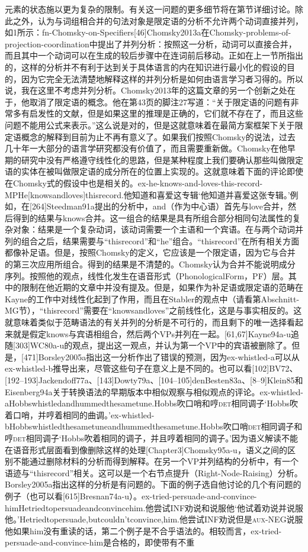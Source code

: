 元素的状态施以更为复杂的限制。有关这一问题的更多细节将在第节详细讨论。除此之外，认为与词组相合并的句法对象是限定语的分析不允许两个动词直接并列，如1所示：fn-Chomsky-on-Specifiers[46]Chomsky2013a在Chomsky-problems-of-projection-coordination中提出了并列分析：按照这一分析，动词可以直接合并，而且其中一个动词可以在生成的较后步骤中在连词前后移动。正如在上一节所指出的，这样的分析并不有利于达到关于具体语言的内在知识进行最小化的假设的目的，因为它完全无法清楚地解释这样的并列分析是如何由语言学习者习得的。所以说，我在这里不考虑并列分析。Chomsky2013年的这篇文章的另一个创新之处在于，他取消了限定语的概念。他在第43页的脚注27写道：“关于限定语的问题有非常多有启发性的文献，但是如果这里的推理是正确的，它们就不存在了，而且这些问题不能用公式来表示。”这么说是对的，但是这就意味着在最简方案框架下关于限定语概念的解释到目前为止不再有意义了。如果我们按照Chomsky的说法，过去几十年一大部分的语言学研究都没有价值了，而且需要重新做。Chomsky在他早期的研究中没有严格遵守线性化的思路，但是某种程度上我们要确认那些叫做限定语的实体在被叫做限定语的成分所在的位置上实现的。这就意味着下面的评论即使在Chomsky式的假设中也是相关的。ex-he-knows-and-loves-this-record-MPHe[knowsandloves]thisrecord.他知道和喜爱这专辑`他知道并喜爱这张专辑。'例如，在[264]Steedman91a提出的分析中，and（作为中心语）首先与love合并，然后得到的结果与knows合并。这一组合的结果是具有所组合部分相同句法属性的复杂对象：结果是一个复杂动词，该动词需要一个主语和一个宾语。在与两个动词并列的组合之后，结果需要与“thisrecord”和“he”组合。“thisrecord”在所有相关方面都像补足语。但是，按照Chomsky的定义，它应该是一个限定语，因为它与合并的第三次应用所组合。得到的结果是不清楚的。Chomsky认为合并不能说明成分序列。按照他的观点，线性化发生在语音形式（PhonologicalForm，PF）层。其中的限制在他近期的文章中并没有提及。但是，如果作为补足语或限定语的范畴在Kayne的工作中对线性化起到了作用，而且在Stabler的观点中（请看第Abschnitt-MG节），“thisrecord”需要在“knowsandloves”之前线性化，这是与事实相反的。这就意味着类似于范畴语法的有关并列的分析是不可行的，而且剩下的唯一选择看起来就是假定knows与宾语相组合，然后两个VPs并列在一起。[61,67]Kayne94a-u追随[303]WC80a-u的观点，提出这一观点，并认为第一个VP中的宾语被删除了。但是，[471]Borsley2005a指出这一分析作出了错误的预测，因为ex-whistled-a可以从ex-whistled-b推导出来，尽管这些句子在意义上是不同的。也可以看[102]BV72、[192--193]Jackendoff77a、[143]Dowty79a、[104--105]denBesten83a、[8--9]Klein85和Eisenberg94a关于转换语法的早期版本中相似观察与相似观点的评论。ex-whistled-aHobbswhistledandhummedthesametune.Hobbs吹口哨和哼\textsc{det}相同调子`Hobbs吹着口哨，并哼着相同的曲调。'ex-whistled-bHobbswhistledthesametuneandhummedthesametune.Hobbs吹口哨\textsc{det}相同调子和哼\textsc{det}相同调子`Hobbs吹着相同的调子，并且哼着相同的调子。'因为语义解读不能在语音形式层面看到像删除这样的处理[Chapter3]Chomsky95a-u，语义之间的区别不能通过删除材料的分析而得到解释。在另一个VP并列结构的分析中，有一个语迹与“thisrecord”相关。这可以是一个右节点提升（Right-Node-Raising）分析。Borsley2005a指出这样的分析是有问题的。下面的例子选自他讨论的几个有问题的例子（也可以看[615]Bresnan74a-u）。ex-tried-persuade-and-convince-himHetriedtopersuadeandconvincehim.他尝试INF劝说和说服他`他试着劝说并说服他。'Hetriedtopersuade,butcouldn'tconvince,him.他尝试INF劝说但是\textsc{aux}-NEG说服他如果him没有重读的话，第二个例子是不合乎语法的。相较而言，ex-tried-persuade-and-convince-him是合格的，即使带有不重